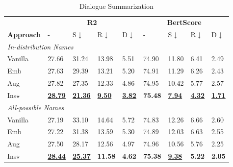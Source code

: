 \begin{table}[t]
	\scriptsize
	\centering
	\begin{subtable}{\linewidth}
		\scriptsize
		\centering
		\begin{tabular}{p{0.9cm}|p{0.36cm}p{0.36cm}p{0.36cm}p{0.36cm}|p{0.36cm}p{0.36cm}p{0.36cm}p{0.38cm}}
			\toprule[1pt]
			& \multicolumn{4}{c|}{\textbf{R2}} & \multicolumn{4}{c}{\textbf{BertScore}} \\
			\textbf{Approach}& - & S$\downarrow$  & R$\downarrow$ & D$\downarrow$& - & S$\downarrow$ & R$\downarrow$& D$\downarrow$  \\
			
			
			\hline
			\multicolumn{9}{l}{\textit{In-distribution Names}}\\
			Vanilla & 27.66 & 31.24  & 13.98 & 5.51 &74.90&11.80&6.41& 2.49\\
			Emb & 27.63 & 29.39& 13.21 & 5.20 &74.91 &11.29 & 6.26& 2.43 \\
			Aug & 27.82 &27.35  & 12.33 & 4.86&74.95& 10.42 & 5.77 &2.57 \\
			

			Ins$\star$  &  \underline{\textbf{28.79}} & \underline{\textbf{21.36}} & \underline{\textbf{9.50}} & \underline{\textbf{3.82}}& \textbf{75.48}&\underline{\textbf{7.94}} & \underline{\textbf{4.32}}& \underline{\textbf{1.71}} \\
			
			\hline
			\multicolumn{9}{l}{\textit{All-possible Names}}\\
			Vanilla & 27.19 & 33.10& 14.64 & 5.72 &74.83&12.26 & 6.66 & 2.60\\
			Emb & 27.22 & 31.38 & 13.59 & 5.30&74.89 &12.03 & 6.63 & 2.55\\
			Aug &27.50 &28.17 & 12.56 & 4.97 &74.96 &10.56 & 5.76 & 2.25 \\
			

			Ins$\star$  &  \underline{\textbf{28.44}} & \underline{\textbf{25.37}}  & \textbf{11.58} & \textbf{4.62}&\textbf{75.38} &\underline{\textbf{9.38}} & \textbf{5.22}& \textbf{2.05} \\
			
			\bottomrule[1pt]
		\end{tabular}
		\caption{Dialogue Summarization}
		\label{tab:mdresults-ds}
	\end{subtable}
	

\end{table}
